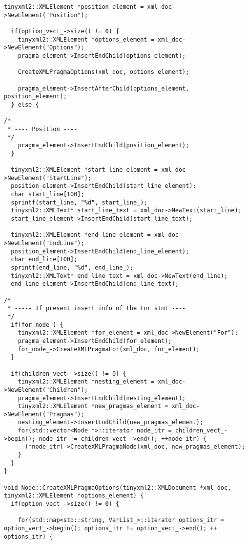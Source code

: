 \documentclass[a4paper,10pt,twoside]{book}
\begin{document}
\begin{lstlisting}[language=CCC, caption=pragma\_handler/Node.cpp]
  tinyxml2::XMLElement *position_element = xml_doc->NewElement("Position");
  
  if(option_vect_->size() != 0) {
    tinyxml2::XMLElement *options_element = xml_doc->NewElement("Options");
    pragma_element->InsertEndChild(options_element);

    CreateXMLPragmaOptions(xml_doc, options_element);

    pragma_element->InsertAfterChild(options_element, position_element);
  } else {

/*
 * ---- Position ----
 */  
    pragma_element->InsertEndChild(position_element);
  }

  tinyxml2::XMLElement *start_line_element = xml_doc->NewElement("StartLine");
  position_element->InsertEndChild(start_line_element);
  char start_line[100];
  sprintf(start_line, "%d", start_line_);
  tinyxml2::XMLText* start_line_text = xml_doc->NewText(start_line);
  start_line_element->InsertEndChild(start_line_text);

  tinyxml2::XMLElement *end_line_element = xml_doc->NewElement("EndLine");
  position_element->InsertEndChild(end_line_element);
  char end_line[100];
  sprintf(end_line, "%d", end_line_);
  tinyxml2::XMLText* end_line_text = xml_doc->NewText(end_line);
  end_line_element->InsertEndChild(end_line_text);

/*
 * ----- If present insert info of the For stmt ---- 
 */
  if(for_node_) {
    tinyxml2::XMLElement *for_element = xml_doc->NewElement("For");
    pragma_element->InsertEndChild(for_element);
    for_node_->CreateXMLPragmaFor(xml_doc, for_element);
  }

  if(children_vect_->size() != 0) {
    tinyxml2::XMLElement *nesting_element = xml_doc->NewElement("Children");
    pragma_element->InsertEndChild(nesting_element);
    tinyxml2::XMLElement *new_pragmas_element = xml_doc->NewElement("Pragmas");
    nesting_element->InsertEndChild(new_pragmas_element);
    for(std::vector<Node *>::iterator node_itr = children_vect_->begin(); node_itr != children_vect_->end(); ++node_itr) {
      (*node_itr)->CreateXMLPragmaNode(xml_doc, new_pragmas_element);
    }
  }
}

void Node::CreateXMLPragmaOptions(tinyxml2::XMLDocument *xml_doc, tinyxml2::XMLElement *options_element) {
  if(option_vect_->size() != 0) {
    
    for(std::map<std::string, VarList_>::iterator options_itr = option_vect_->begin(); options_itr != option_vect_->end(); ++ options_itr) {


\end{lstlisting}
\end{document}
